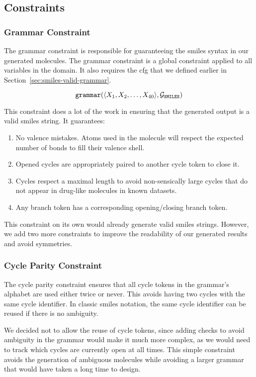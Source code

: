 \documentclass[../Document.tex]{subfiles}
\begin{document}
\subsection{Constraints}

\subsubsection{Grammar Constraint}
The grammar constraint is responsible for guaranteeing the \gls{smiles} syntax in our generated molecules. The grammar constraint is a global constraint applied to all variables in the domain. It also requires the \gls{cfg} that we defined earlier in Section~\ref{sec:smiles-valid-grammar}.

$$
    \texttt{grammar}(\langle X_1, X_2, \ldots, X_{40} \rangle, \mathcal{G}_{\texttt{SMILES}})\\
$$

This constraint does a lot of the work in ensuring that the generated output is a valid \gls{smiles} string. It guarantees:
\begin{enumerate}
    \item No valence mistakes. Atoms used in the molecule will respect the expected number of bonds to fill their valence shell.
    \item Opened cycles are appropriately paired to another cycle token to close it.
    \item Cycles respect a maximal length to avoid non-sensically large cycles that do not appear in drug-like molecules in known datasets.
    \item Any branch token has a corresponding opening/closing branch token.
\end{enumerate}

This constraint on its own would already generate valid \gls{smiles} strings. However, we add two more constraints to improve the readability of our generated results and avoid symmetries.

\subsubsection{Cycle Parity Constraint}
The cycle parity constraint ensures that all cycle tokens in the grammar's alphabet are used either twice or never. This avoids having two cycles with the same cycle identifier. In classic \gls{smiles} notation, the same cycle identifier can be reused if there is no ambiguity.

We decided not to allow the reuse of cycle tokens, since adding checks to avoid ambiguity in the grammar would make it much more complex, as we would need to track which cycles are currently open at all times. This simple constraint avoids the generation of ambiguous molecules while avoiding a larger grammar that would have taken a long time to design.
\end{document}
